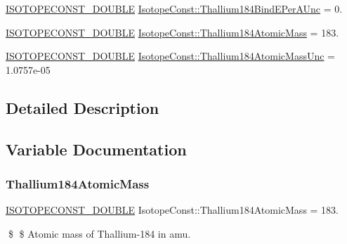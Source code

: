\begin{DoxyCompactItemize}
\mbox{\hyperlink{group___isotope_const-_macros_ga8f45a7272ce02c0b4c65c44636ed719a}{I\+S\+O\+T\+O\+P\+E\+C\+O\+N\+S\+T\+\_\+\+D\+O\+U\+B\+LE}} \mbox{\hyperlink{group___isotope_const-_thallium-_tl184_gacebe5d7e98676560061afe87269359b8}{Isotope\+Const\+::\+Thallium184\+Bind\+E\+Per\+A\+Unc}} = 0.
\item 
\mbox{\hyperlink{group___isotope_const-_macros_ga8f45a7272ce02c0b4c65c44636ed719a}{I\+S\+O\+T\+O\+P\+E\+C\+O\+N\+S\+T\+\_\+\+D\+O\+U\+B\+LE}} \mbox{\hyperlink{group___isotope_const-_thallium-_tl184_ga22bf2b23858750bcc485cf013bed6772}{Isotope\+Const\+::\+Thallium184\+Atomic\+Mass}} = 183.
\item 
\mbox{\hyperlink{group___isotope_const-_macros_ga8f45a7272ce02c0b4c65c44636ed719a}{I\+S\+O\+T\+O\+P\+E\+C\+O\+N\+S\+T\+\_\+\+D\+O\+U\+B\+LE}} \mbox{\hyperlink{group___isotope_const-_thallium-_tl184_gaa71bea4d01d46a53f57fceabc2737798}{Isotope\+Const\+::\+Thallium184\+Atomic\+Mass\+Unc}} = 1.\+0757e-\/05
\end{DoxyCompactItemize}


\subsection{Detailed Description}


\subsection{Variable Documentation}
\mbox{\label{group___isotope_const-_thallium-_tl184_ga22bf2b23858750bcc485cf013bed6772}} 
\subsubsection{\texorpdfstring{Thallium184\+Atomic\+Mass}{Thallium184AtomicMass}}
{\footnotesize\ttfamily \mbox{\hyperlink{group___isotope_const-_macros_ga8f45a7272ce02c0b4c65c44636ed719a}{I\+S\+O\+T\+O\+P\+E\+C\+O\+N\+S\+T\+\_\+\+D\+O\+U\+B\+LE}} Isotope\+Const\+::\+Thallium184\+Atomic\+Mass = 183.}

\$ \$ Atomic mass of Thallium-\/184 in amu. \mbox{\label{group___isotope_const-_thallium-_tl184_gaa71bea4d01d46a53f57fceabc2737798}} 
